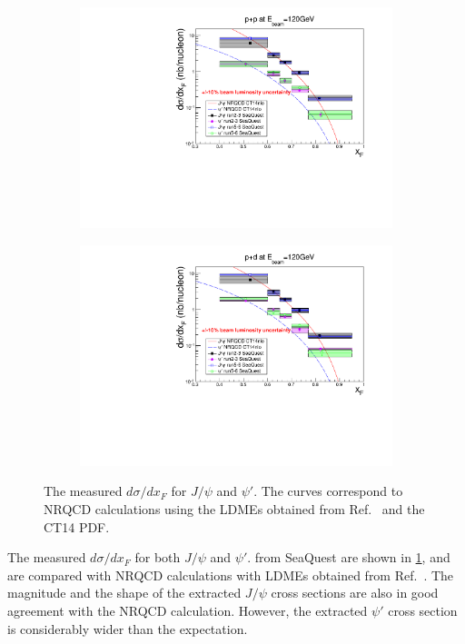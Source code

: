 \documentclass[reprint,aps,unsortedaddress,superscriptaddress,prd,floatfix,showpacs,linenumbers]{revtex4-2}
\begin{document}
\begin{figure}[h]
	\begin{subfigure}{0.45\linewidth}
		\includegraphics[width=\linewidth]{figures/crossSections/xF/combine_xF_LH2_5-6_5770_psip}
	\end{subfigure}
	\begin{subfigure}{0.45\linewidth}
		\includegraphics[width=\linewidth]{figures/crossSections/xF/combine_xF_LD2_5-6_5770_psip}
	\end{subfigure}
	\caption{The measured $d\sigma /d x_F$ for $J/\psi$ and $\psi'$. The curves correspond to NRQCD
		calculations using the LDMEs obtained from Ref.~\cite{hsieh2021} and the CT14 PDF.}
	\label{fig:xF_cross_sections}
\end{figure}
The measured $d\sigma /d x_F$ for both $J/\psi$ and $\psi'$. from SeaQuest are shown in
\cref{fig:xF_cross_sections}, and are compared with NRQCD calculations with LDMEs obtained
from Ref.~\cite{hsieh2021}. The magnitude and the shape of the extracted $J/\psi$ cross
sections are also in good agreement with the NRQCD calculation. However, the extracted
$\psi'$ cross section is considerably wider than the expectation.
\end{document}
